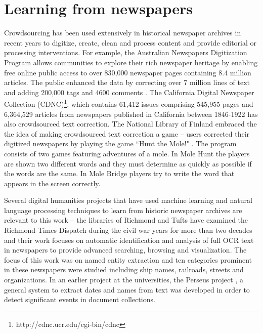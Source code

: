 \documentclass[letterpaper,11pt]{report}
\begin{document}
\section{Learning from newspapers}

Crowdsourcing has been used extensively in historical newspaper archives in recent years to 
digitize, create, clean and process content and provide editorial or processing interventions. For example, the Australian Newspapers Digitization Program \cite{ADNP} allows communities to explore their rich newspaper heritage by enabling free online public access to over 830,000 newspaper pages containing 8.4 million articles. The public enhanced the data by correcting over 7 million lines of text and adding 200,000 tags and 4600 comments \cite{holley_09,holley_09a,Holley_10,Holley10a}. The California Digital Newspaper Collection (CDNC)\footnote{http://cdnc.ucr.edu/cgi-bin/cdnc}, which contains 61,412 issues comprising 545,955 pages and 6,364,529 articles from newspapers published in California between 1846-1922 has also crowdsourced text correction. The National Library of Finland embraced the the idea of making crowdsourced text correction a game -- users corrected their digitized newspapers by playing the game ``Hunt the Mole!" \cite{chrons_11}. The program consists of two games featuring adventures of a mole. In Mole Hunt the players are shown two different words and they must determine as quickly as possible if the words are the same. In Mole Bridge players try to write the word that appears in the screen correctly. 

Several digital humanities projects that have used machine learning and natural language processing techniques to learn from historic newspaper archives are relevant to this work -- the libraries of Richmond and Tufts have examined the Richmond Times Dispatch during the civil war years for more than two decades and their work focuses on automatic identification and analysis of full OCR text in newspapers to provide advanced searching, browsing and visualization\cite{crane2006challenge}. The focus of this work was on named entity extraction and ten categories prominent in these newspapers were studied including ship names, railroads, streets and organizations. In an earlier project at the universities, the Perseus project \cite{smith2002detectinga, smith2002detectingb, smith2001disambiguating}, a general system to extract dates and names from text was developed in order to detect significant events in document collections. 
\end{document}
